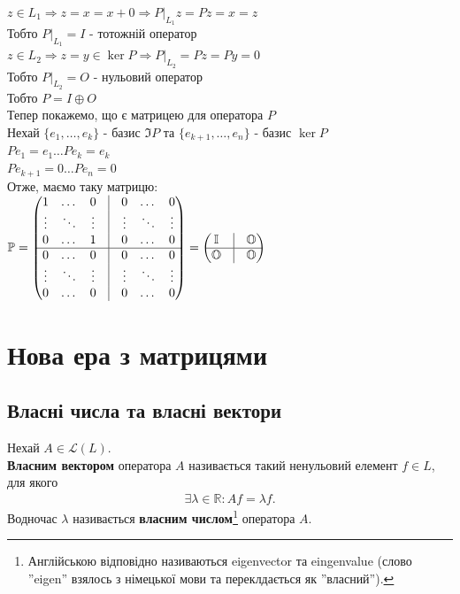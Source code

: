 \documentclass{math_library}
\begin{document}
$z \in L_1 \Rightarrow z = x = x+0 \Rightarrow P|_{L_1}z = Pz = x = z$\\
Тобто $P|_{L_1} = I$ - тотожній оператор\\
$z \in L_2 \Rightarrow z = y \in \ker P \Rightarrow P|_{L_2} = Pz = Py = 0$\\
Тобто $P|_{L_2} = O$ - нульовий оператор\\
Тобто $P = I  \oplus  O$
\bigskip \\
Тепер покажемо, що є матрицею для оператора $P$\\
Нехай $\{e_1,\dots,e_k\}$ - базис $\Im P$ та $\{e_{k+1},\dots,e_n\}$ - базис $\ker P$\\
$Pe_1 = e_1 \dots Pe_k = e_k$\\
$Pe_{k+1} = 0 \dots Pe_n = 0$\\
Отже, маємо таку матрицю:\\
$\mathbb{P} = \begin{pmatrix}
1 & \dots & 0 & \vline & 0 & \dots & 0 \\
\vdots & \ddots & \vdots & \vline & \vdots & \ddots & \vdots \\
0 & \dots & 1 & \vline & 0 & \dots & 0 \\
\hline
0 & \dots & 0 & \vline & 0 & \dots & 0 \\
\vdots & \ddots & \vdots & \vline & \vdots & \ddots & \vdots \\
0 & \dots & 0 & \vline & 0 & \dots & 0 \\
\end{pmatrix} = \begin{pmatrix}
\mathbb{I}  & \vline & \mathbb{O} \\
 \hline
\mathbb{O} & \vline & \mathbb{O}
\end{pmatrix}$
\fi

\newpage

\setcounter{section}{3}
\setcounter{subsection}{0}
\section{Нова ера з матрицями}
\subsection{Власні числа та власні вектори}
\begin{definition}
Нехай $A \in \mathcal{L}(L)$.\\
\textbf{Власним вектором} оператора $A$ називається такий ненульовий елемент $f \in L$, для якого
\begin{align*}
\exists \lambda \in \mathbb{R}: Af = \lambda f.
\end{align*}
Водночас $\lambda$ називається \textbf{власним числом}\footnote{Англійською відповідно називаються eigenvector та eingenvalue (слово ''eigen'' взялось з німецької мови та переклдається як ''власний'').} оператора $A$.
\end{definition}
\end{document}
